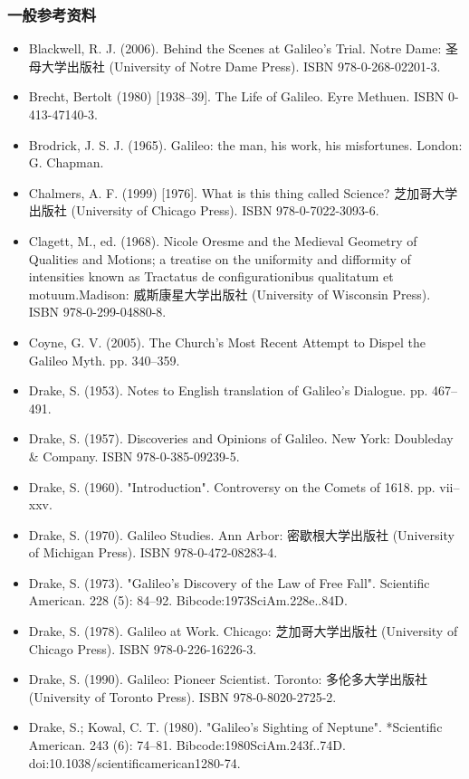\subsubsection{一般参考资料}
\begin{itemize}
\item Blackwell, R. J. (2006). Behind the Scenes at Galileo’s Trial. Notre Dame: 圣母大学出版社 (University of Notre Dame Press). ISBN 978-0-268-02201-3.  
\item Brecht, Bertolt (1980) [1938–39]. The Life of Galileo. Eyre Methuen. ISBN 0-413-47140-3.  
\item Brodrick, J. S. J. (1965). Galileo: the man, his work, his misfortunes. London: G. Chapman.  
\item Chalmers, A. F. (1999) [1976]. What is this thing called Science? 芝加哥大学出版社 (University of Chicago Press). ISBN 978-0-7022-3093-6.  
\item Clagett, M., ed. (1968). Nicole Oresme and the Medieval Geometry of Qualities and Motions; a treatise on the uniformity and difformity of intensities known as Tractatus de configurationibus qualitatum et motuum.Madison: 威斯康星大学出版社 (University of Wisconsin Press). ISBN 978-0-299-04880-8.  
\item Coyne, G. V. (2005). The Church's Most Recent Attempt to Dispel the Galileo Myth. pp. 340–359.  
\item Drake, S. (1953). Notes to English translation of Galileo's Dialogue. pp. 467–491.  
\item Drake, S. (1957). Discoveries and Opinions of Galileo. New York: Doubleday & Company. ISBN 978-0-385-09239-5.  
\item Drake, S. (1960). "Introduction". Controversy on the Comets of 1618. pp. vii–xxv.  
\item Drake, S. (1970). Galileo Studies. Ann Arbor: 密歇根大学出版社 (University of Michigan Press). ISBN 978-0-472-08283-4.  
\item Drake, S. (1973). "Galileo’s Discovery of the Law of Free Fall". Scientific American. 228 (5): 84–92. Bibcode:1973SciAm.228e..84D.  
\item Drake, S. (1978). Galileo at Work. Chicago: 芝加哥大学出版社 (University of Chicago Press). ISBN 978-0-226-16226-3.  
\item Drake, S. (1990). Galileo: Pioneer Scientist. Toronto: 多伦多大学出版社 (University of Toronto Press). ISBN 978-0-8020-2725-2.  
\item Drake, S.; Kowal, C. T. (1980). "Galileo's Sighting of Neptune". *Scientific American. 243 (6): 74–81. Bibcode:1980SciAm.243f..74D. doi:10.1038/scientificamerican1280-74.  

\end{itemize}
